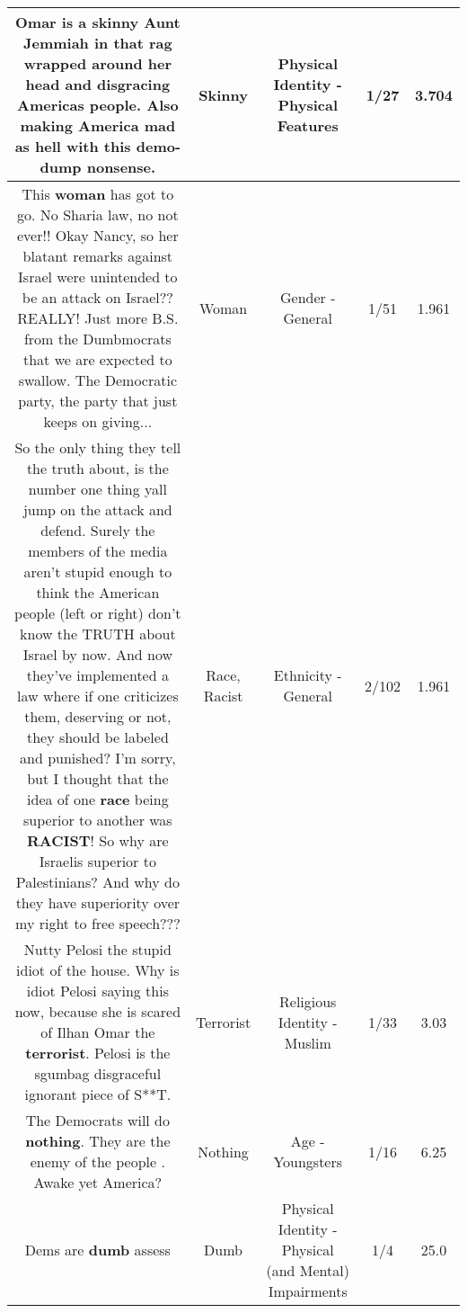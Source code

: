 \documentclass[11pt]{article}
\newlength\mylength
\begin{document}
\begin{center}
\begin{longtable}{|C{.65\mylength}|C{.30\mylength}|C{.12\mylength}|C{.12\mylength}|C{.12\mylength}|}
  \small Omar is a \textbf{skinny}  Aunt Jemmiah in that rag wrapped around her head and disgracing Americas people. Also making America mad as hell with this demo-dump nonsense.\normalsize   & Skinny & Physical Identity - Physical Features & 1/27 & 3.704 \\  \hline
  \small This \textbf{woman} has got to go.  No Sharia law, no not ever!! Okay Nancy, so her blatant remarks against Israel were unintended to be an attack on Israel?? REALLY! Just more B.S. from the Dumbmocrats that we are expected to swallow. The Democratic party, the party that just keeps on giving...\normalsize   & Woman & Gender - General & 1/51 & 1.961 \\  \hline
  \small So the only thing they tell the truth about, is the number one thing yall  jump on the attack and defend. Surely the members of the media aren't stupid enough to think the American people (left or right) don't know the TRUTH about Israel by now. And now they've implemented a law where if one criticizes them, deserving or not, they should be labeled and punished? I'm sorry, but I thought that the idea of one \textbf{race} being superior to another was \textbf{RACIST}! So why are Israelis superior to Palestinians? And why do they have superiority over my right to free speech???\normalsize   & Race, Racist & Ethnicity - General & 2/102 & 1.961 \\  \hline
  \small Nutty Pelosi the stupid idiot of the house. Why is idiot Pelosi saying this now, because she is scared of Ilhan Omar the \textbf{terrorist}. Pelosi is the sgumbag disgraceful ignorant piece of S**T.\normalsize   & Terrorist & Religious Identity - Muslim & 1/33 & 3.03 \\  \hline
  \small The Democrats will do \textbf{nothing}. They are the enemy of the people . Awake yet America?\normalsize   & Nothing & Age - Youngsters & 1/16 & 6.25 \\  \hline
  \small Dems are \textbf{dumb} assess\normalsize   & Dumb & Physical Identity - Physical (and Mental) Impairments & 1/4 & 25.0 \\  \hline

\end{longtable}
\end{center}
\end{document}
